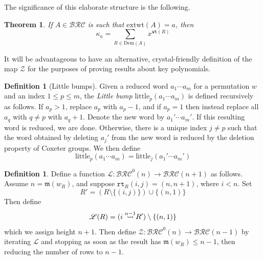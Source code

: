 \documentclass{amsart}
\newtheorem{theorem}{Theorem}[section]
\theoremstyle{definition}
\newtheorem{definition}[lemma]{Definition}
\theoremstyle{remark}
\numberwithin{equation}{subsection}
\newcommand{\wof}[1]{w_{#1}}
\newcommand{\wtt}{\mathtt{wt}}
\newcommand{\rtt}{\mathtt{rt}}
\newcommand{\zeromap}{\mathcal{Z}}
\newcommand{\BRC}{\mathcal{BRC}}
\newcommand{\lzeromap}{\mathscr{Z}}
\newcommand{\lmap}{\mathscr{L}}
\newcommand{\ltb}{\mathrm{little}}
\newcommand{\maxd}{\mathfrak{m}}
\begin{document}
The significance of this elaborate structure is the following.
\begin{theorem} \label{theorem:keykey}
If $A\in\BRC$ is such that $\mathrm{extwt}(A) = a$, then
$$\kappa_a = \sum_{R\in\mathrm{Dem}(A)} x^{\wtt(R)}$$
\end{theorem}

It will be advantageous to have an alternative, crystal-friendly definition of the map $\zeromap$ for the purposes of proving results about key polynomials.

\begin{definition}[Little bumps]
  Given a reduced word $a_1\cdots a_m$ for a permutation $w$ and an index $1\leq p\leq m$, the \emph{Little bump} $\ltb_p(a_1\cdots a_m)$ is defined recursively as follows. If $a_p>1$, replace $a_p$ with $a_p-1$, and if $a_p=1$ then instead replace all $a_q$ with $q\neq p$ with $a_q+1$. Denote the new word by $a_1'\cdots a_m'$. If this resulting word is reduced, we are done. Otherwise, there is a unique index $j\neq p$ such that the word obtained by deleting $a_j'$ from the new word is reduced by the deletion property of Coxeter groups. We then define
  $$\ltb_p(a_1\cdots a_m) = \ltb_j(a_1'\cdots a_m')$$
\end{definition}

\begin{definition}
Define a function $\lmap:\BRC^0(n)\to\BRC(n+1)$ as follows. Assume $n=\maxd(\wof{R})$, and suppose $\rtt_R(i, j) = (n, n + 1)$, where $i < n$. Set 
$$R'= (R\setminus \{(i, j)\})\cup \{(n,1)\}$$
Then define
$$\lmap(R) = (\ins{n-1}{i} R')\setminus\{(n, 1)\}$$
which we assign height $n+1$. Then define $\lzeromap:\BRC^0(n)\to \BRC(n-1)$ by iterating $\lmap$ and stopping as soon as the result has $\maxd(\wof{R})\leq n-1$, then reducing the number of rows to $n-1$.
\end{definition}
\end{document}
